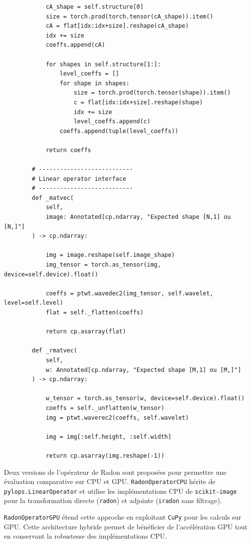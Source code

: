 \begin{verbatim}
            cA_shape = self.structure[0]
            size = torch.prod(torch.tensor(cA_shape)).item()
            cA = flat[idx:idx+size].reshape(cA_shape)
            idx += size
            coeffs.append(cA)

            for shapes in self.structure[1:]:
                level_coeffs = []
                for shape in shapes:
                    size = torch.prod(torch.tensor(shape)).item()
                    c = flat[idx:idx+size].reshape(shape)
                    idx += size
                    level_coeffs.append(c)
                coeffs.append(tuple(level_coeffs))

            return coeffs

        # ---------------------------
        # Linear operator interface
        # ---------------------------
        def _matvec(
            self,
            image: Annotated[cp.ndarray, "Expected shape [N,1] ou [N,]"]
        ) -> cp.ndarray:

            img = image.reshape(self.image_shape)
            img_tensor = torch.as_tensor(img, device=self.device).float()

            coeffs = ptwt.wavedec2(img_tensor, self.wavelet, level=self.level)
            flat = self._flatten(coeffs)

            return cp.asarray(flat)

        def _rmatvec(
            self,
            w: Annotated[cp.ndarray, "Expected shape [M,1] ou [M,]"]
        ) -> cp.ndarray:

            w_tensor = torch.as_tensor(w, device=self.device).float()
            coeffs = self._unflatten(w_tensor)
            img = ptwt.waverec2(coeffs, self.wavelet)

            img = img[:self.height, :self.width]

            return cp.asarray(img.reshape(-1))

\end{verbatim}


Deux versions de l'opérateur de Radon sont proposées pour permettre une évaluation comparative sur CPU et GPU. \texttt{RadonOperatorCPU} hérite de \texttt{pylops.LinearOperator} et utilise les implémentations CPU de \texttt{scikit-image} pour la transformation directe (\texttt{radon}) et adjointe (\texttt{iradon} sans filtrage).

\texttt{RadonOperatorGPU} étend cette approche en exploitant \texttt{CuPy} pour les calculs sur GPU. Cette architecture hybride permet de bénéficier de l'accélération GPU tout en conservant la robustesse des implémentations CPU.

